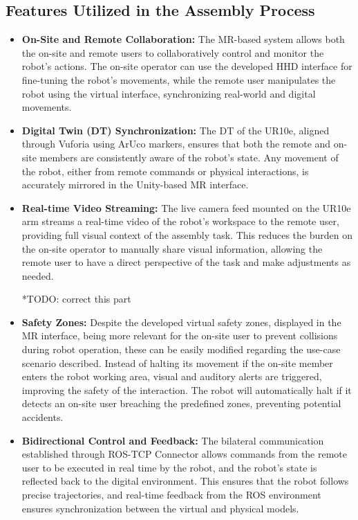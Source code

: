     \subsection{Features Utilized in the Assembly Process}
    
    \begin{itemize}
        \item \textbf{On-Site and Remote Collaboration:} The \ac{MR}-based system allows both the on-site and remote users to collaboratively control and monitor the robot’s actions. The on-site operator can use the developed \ac{HHD} interface for fine-tuning the robot’s movements, while the remote user manipulates the robot using the virtual interface, synchronizing real-world and digital movements.
        
        \item \textbf{Digital Twin (\ac{DT}) Synchronization:} The \ac{DT} of the UR10e, aligned through Vuforia using ArUco markers, ensures that both the remote and on-site members are consistently aware of the robot’s state. Any movement of the robot, either from remote commands or physical interactions, is accurately mirrored in the Unity-based \ac{MR} interface.
    
        \item \textbf{Real-time Video Streaming:} The live camera feed mounted on the UR10e arm streams a real-time video of the robot’s workspace to the remote user, providing full visual context of the assembly task. This reduces the burden on the on-site operator to manually share visual information, allowing the remote user to have a direct perspective of the task and make adjustments as needed.
    
        *TODO: correct this part 
        \item \textbf{Safety Zones:} Despite the developed virtual safety zones, displayed in the \ac{MR} interface, being more relevant for the on-site user to prevent collisions during robot operation, these can be easily modified regarding the use-case scenario described. Instead of halting its movement if the on-site member enters the robot working area, visual and auditory alerts are triggered, improving the safety of the interaction. The robot will automatically halt if it detects an on-site user breaching the predefined zones, preventing potential accidents.
    
        \item \textbf{Bidirectional Control and Feedback:} The bilateral communication established through ROS-TCP Connector allows commands from the remote user to be executed in real time by the robot, and the robot’s state is reflected back to the digital environment. This ensures that the robot follows precise trajectories, and real-time feedback from the ROS environment ensures synchronization between the virtual and physical models.
    

\end{itemize}

